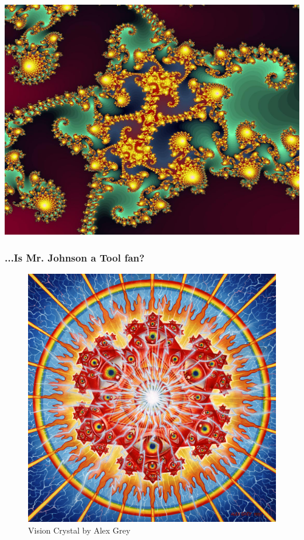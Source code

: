 \documentclass{beamer}
\theoremstyle{mystyle}
\begin{document}
\begin{frame}
\begin{center}
	\includegraphics[scale=0.11]{fractal1.jpg}
\end{center}
\end{frame}


\begin{frame}
\frametitle{...Is Mr. Johnson a Tool fan?}

\begin{center}
	\begin{figure}
		\includegraphics[scale=0.15]{lateralus.jpg}
		\caption{Vision Crystal by Alex Grey}
	\end{figure}
\end{center}

\end{frame}
\end{document}

